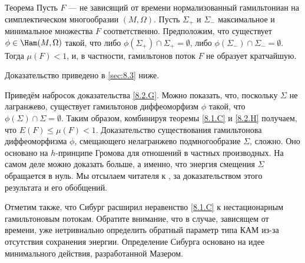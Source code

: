 \begin{thm}{Теорема}\label{8.2.H}
Пусть $F$ --- не зависящий от времени нормализованный гамильтониан на симплектическом многообразии $ (M, \Omega)$.
Пусть $\Sigma_+$  и $\Sigma_-$  максимальное и минимальное множества $F$ соответственно.
Предположим, что существует $\phi \in \Ham (M, \Omega)$ такой, что либо $\phi (\Sigma_+) \cap \Sigma_+ = \emptyset$, либо $\phi (\Sigma_-) \cap \Sigma_- = \emptyset$.
Тогда $\mu (F) <1$, и, в частности, гамильтонов поток $F$ не образует кратчайшую.
\end{thm}

Доказательство приведено в \ref{sec:8.3} ниже.

Приведём набросок доказательства \ref{8.2.G}.
Можно показать, что, поскольку $\Sigma$ не лагранжево, существует гамильтонов диффеоморфизм $\phi$ такой, что $\phi (\Sigma) \cap \Sigma = \emptyset$.
Таким образом, комбинируя теоремы \ref{8.1.C} и \ref{8.2.H} получаем, что $E (F) \le \mu (F) <1$.
Доказательство существования гамильтонова диффеоморфизма $\phi$, смещающего нелагранжево подмногообразие $\Sigma$, сложно.
Оно основано на $h$-принципе Громова для отношений в частных производных.
На самом деле можно доказать больше, а именно, что энергия смещения $\Sigma$ обращается в нуль.
Мы отсылаем читателя к \cite{P2}, \cite{LS} за доказательством этого результата и его обобщений.

Отметим также, что Сибург \cite{Si2} расширил неравенство \ref{8.1.C} к нестационарным гамильтоновым потокам.
Обратите внимание, что в случае, зависящем от времени, уже нетривиально определить обратный параметр типа КАМ из-за отсутствия сохранения энергии.
Определение Сибурга основано на идее минимального действия, разработанной Мазером.
